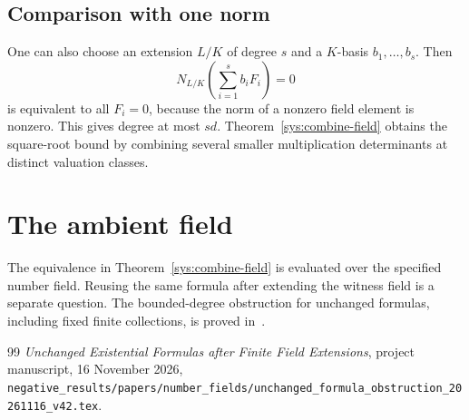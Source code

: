 \documentclass[11pt,a4paper]{article}
\theoremstyle{definition}
\begin{document}
\subsection*{Comparison with one norm}

One can also choose an extension $L/K$ of degree $s$ and a
$K$-basis $b_1,\ldots,b_s$. Then
\[
              N_{L/K}\left(\sum_{i=1}^s b_iF_i\right)=0
\]
is equivalent to all $F_i=0$, because the norm of a nonzero
field element is nonzero. This gives degree at most $sd$.
Theorem~\ref{sys:combine-field} obtains the square-root bound by
combining several smaller multiplication determinants at
distinct valuation classes.

\section{The ambient field}

The equivalence in Theorem~\ref{sys:combine-field} is evaluated over
the specified number field. Reusing the same formula after extending
the witness field is a separate question. The bounded-degree
obstruction for unchanged formulas, including fixed finite collections,
is proved in~\cite{UnchangedFormulas}.

\begin{thebibliography}{99}
\emph{Unchanged Existential Formulas after Finite Field Extensions},
project manuscript, 16 November 2026,
\nolinkurl{negative_results/papers/number_fields/unchanged_formula_obstruction_20261116_v42.tex}.
\end{thebibliography}
\end{document}
